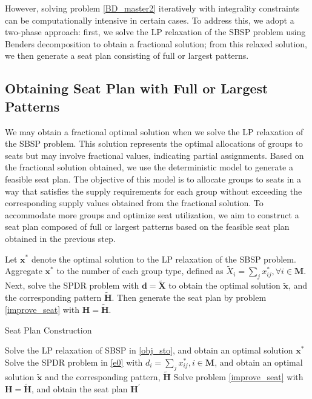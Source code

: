 However, solving problem \eqref{BD_master2} iteratively with integrality constraints can be computationally intensive in certain cases. To address this, we adopt a two-phase approach: first, we solve the LP relaxation of the SBSP problem using Benders decomposition to obtain a fractional solution; from this relaxed solution, we then generate a seat plan consisting of full or largest patterns.

\subsection{Obtaining Seat Plan with Full or Largest Patterns}\label{seat_assignment}
We may obtain a fractional optimal solution when we solve the LP relaxation of the SBSP problem. This solution represents the optimal allocations of groups to seats but may involve fractional values, indicating partial assignments. Based on the fractional solution obtained, we use the deterministic model to generate a feasible seat plan. The objective of this model is to allocate groups to seats in a way that satisfies the supply requirements for each group without exceeding the corresponding supply values obtained from the fractional solution. To accommodate more groups and optimize seat utilization, we aim to construct a seat plan composed of full or largest patterns based on the feasible seat plan obtained in the previous step. 


Let $\mathbf{x}^{*}$ denote the optimal solution to the LP relaxation of the SBSP problem. Aggregate $\mathbf{x}^{*}$ to the number of each group type, defined as $\tilde{X}_{i} =\sum_{j} x^{*}_{ij}, \forall i \in \mathbf{M}$. Next, solve the SPDR problem with $\bm{d} = \bm{\tilde{X}}$ to obtain the optimal solution $\mathbf{\tilde{x}}$, and the corresponding pattern $\tilde{\bm{H}}$. Then generate the seat plan by problem \eqref{improve_seat} with $\bm{H}=  \tilde{\bm{H}}$.


\begin{algorithm}
  \caption{Seat Plan Construction}\label{seat_construction}
    {Solve the LP relaxation of SBSP in \eqref{obj_sto}, and obtain an optimal solution $\mathbf{x}^{*}$\;}
    {Solve the SPDR problem in \eqref{e0} with $d_{i} = \sum_{j} x^{*}_{ij}, i \in \mathbf{M}$, and obtain an optimal solution $\tilde{\mathbf{x}}$ and the corresponding pattern, $\tilde{\bm{H}}$\;}
    {Solve problem \eqref{improve_seat} with $\bm{H} = \tilde{\bm{H}}$, and obtain the seat plan $\bm{H}^{\prime}$\;}
\end{algorithm}

